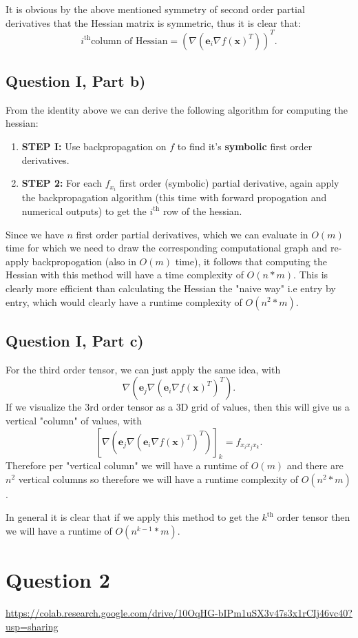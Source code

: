 \documentclass[a4paper]{article}
\begin{document}
It is obvious by the above mentioned symmetry of second order partial derivatives
that the Hessian matrix is symmetric, thus it is clear that:
\[
    i^{\text{th}} \text{column of Hessian} = (\nabla (\bm{e}_i \nabla f(\bm{x})^T))^T
.\]

\subsection*{Question I, Part b)}
From the identity above we can derive the following algorithm for computing the hessian:
 \begin{enumerate}
\item \textbf{STEP I:} Use backpropagation on $f$ to find it's  \textbf{symbolic} first order derivatives.    
\item \textbf{STEP 2:} For each $f_{x_i}$ first order (symbolic) partial derivative, again 
    apply the backpropagation algorithm (this time with forward propogation and numerical outputs)
    to get the $i^{\text{th}}$ row of the hessian.
\end{enumerate}
Since we have $n$ first order partial derivatives, which we can evaluate in $O(m)$ time
for which we need to draw the corresponding computational graph and re-apply backpropogation (also in $O(m)$ time),
it follows that computing the Hessian with this method will have a time complexity of $O(n*m)$.
This is clearly more efficient than calculating the Hessian the "naive way" i.e entry by entry,
which would clearly have a runtime complexity of $O(n^2*m)$.

\subsection*{Question I, Part c)}
For the third order tensor, we can just apply the same idea,
with
\[
\nabla (\bm{e}_j \nabla (\bm{e}_i \nabla f(\bm{x})^T)^T)
.\]
If we visualize the 3rd order tensor as a 3D grid of values, then this
will give us a vertical "column" of values, with
\[
    [\nabla (\bm{e}_j \nabla (\bm{e}_i \nabla f(\bm{x})^T)^T)]_{k} = f_{x_{i}x_{j}x_{k}}
.\]
Therefore per "vertical column" we will have a runtime of $O(m)$ and there
are  $n^2$ vertical columns so therefore we will have a runtime complexity of $O(n^2 * m)$.

In general it is clear that if we apply this method to get the $k^{\text{th}}$ order
tensor then we will have a runtime of $O(n^{k-1} * m)$.

\section*{Question 2}
\url{https://colab.research.google.com/drive/10OqHG-bIPm1uSX3v47s3x1rCIj46vc40?usp=sharing}
\end{document}
